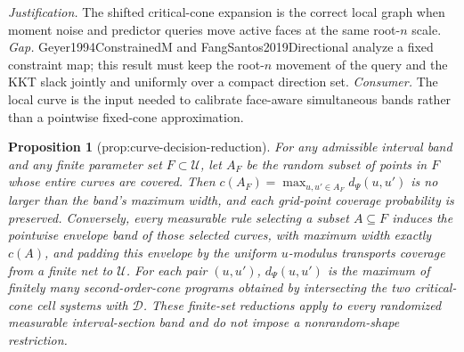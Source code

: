 \documentclass{article}
\newtheorem{proposition}{Proposition}
\begin{document}
\par\smallskip\noindent \textit{Justification.} The shifted critical-cone expansion is the correct local graph when moment noise and predictor queries move active faces at the same root-\(n\) scale. \textit{Gap.} Geyer1994ConstrainedM and FangSantos2019Directional analyze a fixed constraint map; this result must keep the root-\(n\) movement of the query and the KKT slack jointly and uniformly over a compact direction set. \textit{Consumer.} The local curve is the input needed to calibrate face-aware simultaneous bands rather than a pointwise fixed-cone approximation.

\begin{proposition}[prop:curve-decision-reduction]\label{prop:curve-decision-reduction}
For any admissible interval band and any finite parameter set \(F\subset\mathcal U\), let \(A_F\) be the random subset of points in \(F\) whose entire curves are covered. Then \(c(A_F)=\max_{u,u'\in A_F}d_\Psi(u,u')\) is no larger than the band's maximum width, and each grid-point coverage probability is preserved. Conversely, every measurable rule selecting a subset \(A\subseteq F\) induces the pointwise envelope band of those selected curves, with maximum width exactly \(c(A)\), and padding this envelope by the uniform \(u\)-modulus transports coverage from a finite net to \(\mathcal U\). For each pair \((u,u')\), \(d_\Psi(u,u')\) is the maximum of finitely many second-order-cone programs obtained by intersecting the two critical-cone cell systems with \(\mathcal D\). These finite-set reductions apply to every randomized measurable interval-section band and do not impose a nonrandom-shape restriction.
\end{proposition}
\end{document}
